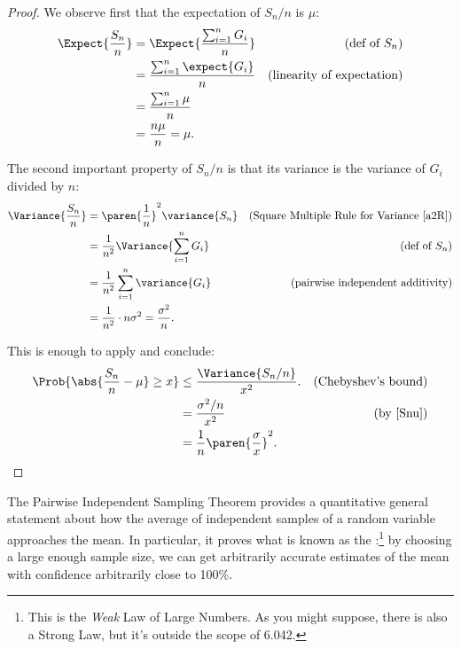 \begin{proof}
We observe first that the expectation of $S_n/n$ is $\mu$:
\begin{align*}
\Expect{\frac{S_n}{n}} & = \Expect{\frac{\sum_{i=1}^n G_i}{n}}
         & \text{(def of $S_n$)}\\
 & = \frac{\sum_{i=1}^n \expect{G_i}}{n} 
     & \text{(linearity of expectation)}\\
 & = \frac{\sum_{i=1}^n \mu}{n}\\
 & = \frac{n\mu}{n} = \mu.
\end{align*}

The second important property of $S_n/n$ is that its variance is the
variance of $G_i$ divided by $n$:
\begin{align}
\Variance{\frac{S_n}{n}} & =  \paren{\frac{1}{n}}^2 \variance{S_n}
          & \mbox{(Square Multiple Rule for Variance~\eqref{a2R})}\notag\\
 & =  \frac{1}{n^2} \Variance{\sum_{i=1}^n G_i} 
          & \text{(def of $S_n$)}\notag\\
 & =  \frac{1}{n^2} \sum_{i=1}^n \variance{G_i}
        & \text{(pairwise independent additivity)}\notag\\
 & =  \frac{1}{n^2}\cdot n\sigma^2 =  \frac{\sigma^2}{n}.\label{Snu}
\end{align}

This is enough to apply  and conclude:
\begin{align*}
\Prob{\abs{\frac{S_n}{n} - \mu} \geq x} & \leq \frac{\Variance{S_n/n}}{x^2}.
       & \text{(Chebyshev's bound)}\\
    & = \frac{\sigma^2/n}{x^2} & \text{(by~\eqref{Snu})}\\
    & = \frac{1}{n} \paren{\frac{\sigma}{x}}^2.
\end{align*}

\end{proof}

The Pairwise Independent Sampling Theorem provides a quantitative
general statement about how the average of independent samples of a
random variable approaches the mean.  In particular, it proves what is
known as the :\footnote{This is the
   \emph{Weak} Law of Large Numbers.
  As you might suppose, there is also a Strong Law, but it's outside
  the scope of 6.042.} by choosing a large enough sample size, we can
get arbitrarily accurate estimates of the mean with confidence
arbitrarily close to 100\%.

